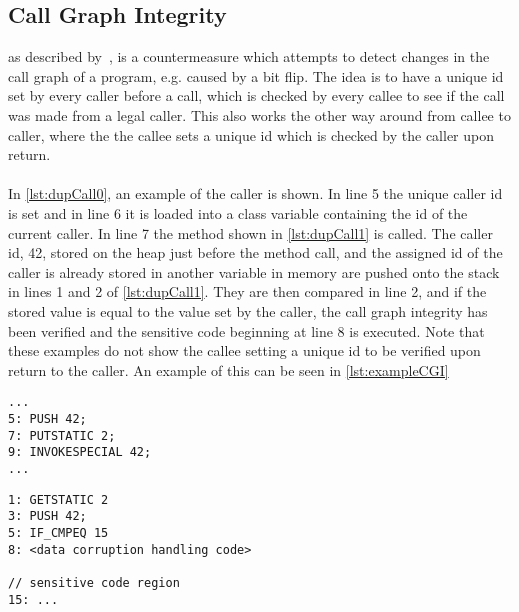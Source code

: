 \subsection{Call Graph Integrity} as described by~\cite[p. 12]{javasec}, is a countermeasure which attempts to detect changes in the call graph of a program, e.g. caused by a bit flip. The idea is to have a unique id set by every caller before a call, which is checked by every callee to see if the call was made from a legal caller. This also works the other way around from callee to caller, where the the callee sets a unique id which is checked by the caller upon return.\\\\
In \cref{lst:dupCall0}, an example of the caller is shown. In line 5 the unique caller id is set and in line 6 it is loaded into a class variable containing the id of the current caller. In line 7 the method shown in \cref{lst:dupCall1} is called. The caller id, 42, stored on the heap just before the method call, and the assigned id of the caller is already stored in another variable in memory are pushed onto the stack in lines 1 and 2 of \ref{lst:dupCall1}. They are then compared in line 2, and if the stored value is equal to the value set by the caller, the call graph integrity has been verified and the sensitive code beginning at line 8 is executed. Note that these examples do not show the callee setting a unique id to be verified upon return to the caller. An example of this can be seen in \cref{lst:exampleCGI}

\begin{minipage}{\linewidth}
\begin{lstlisting}[caption={Caller with call graph integrity implemented. The code is written in \jcl. Note that for simplicity, the numbers in the left side are line numbers and do not denote the program counter values.}, label={lst:dupCall0}]
...
5: PUSH 42; 
7: PUTSTATIC 2;
9: INVOKESPECIAL 42;
...
\end{lstlisting}
\end{minipage}

\begin{minipage}{\linewidth}
\begin{lstlisting}[caption={Callee with call graph integrity implemented. The code is written in \jcl. Note that for simplicity, the numbers in the left side are line numbers and do not denote the program counter values.}, label={lst:dupCall1}]
1: GETSTATIC 2
3: PUSH 42;
5: IF_CMPEQ 15
8: <data corruption handling code>

// sensitive code region
15: ...
\end{lstlisting}
\end{minipage}